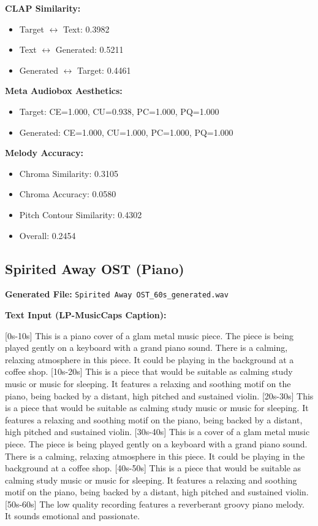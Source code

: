 \documentclass{article}
\begin{document}
\textbf{CLAP Similarity:}
\begin{itemize}
    \item Target $\leftrightarrow$ Text: 0.3982
    \item Text $\leftrightarrow$ Generated: 0.5211
    \item Generated $\leftrightarrow$ Target: 0.4461
\end{itemize}

\textbf{Meta Audiobox Aesthetics:}
\begin{itemize}
    \item Target: CE=1.000, CU=0.938, PC=1.000, PQ=1.000
    \item Generated: CE=1.000, CU=1.000, PC=1.000, PQ=1.000
\end{itemize}

\textbf{Melody Accuracy:}
\begin{itemize}
    \item Chroma Similarity: 0.3105
    \item Chroma Accuracy: 0.0580
    \item Pitch Contour Similarity: 0.4302
    \item Overall: 0.2454
\end{itemize}

\subsection{Spirited Away OST (Piano)}

\textbf{Generated File:} \texttt{Spirited Away OST\_60s\_generated.wav}

\textbf{Text Input (LP-MusicCaps Caption):}

\small
[0s-10s] This is a piano cover of a glam metal music piece. The piece is being played gently on a keyboard with a grand piano sound. There is a calming, relaxing atmosphere in this piece. It could be playing in the background at a coffee shop. [10s-20s] This is a piece that would be suitable as calming study music or music for sleeping. It features a relaxing and soothing motif on the piano, being backed by a distant, high pitched and sustained violin. [20s-30s] This is a piece that would be suitable as calming study music or music for sleeping. It features a relaxing and soothing motif on the piano, being backed by a distant, high pitched and sustained violin. [30s-40s] This is a cover of a glam metal music piece. The piece is being played gently on a keyboard with a grand piano sound. There is a calming, relaxing atmosphere in this piece. It could be playing in the background at a coffee shop. [40s-50s] This is a piece that would be suitable as calming study music or music for sleeping. It features a relaxing and soothing motif on the piano, being backed by a distant, high pitched and sustained violin. [50s-60s] The low quality recording features a reverberant groovy piano melody. It sounds emotional and passionate.
\normalsize
\end{document}
